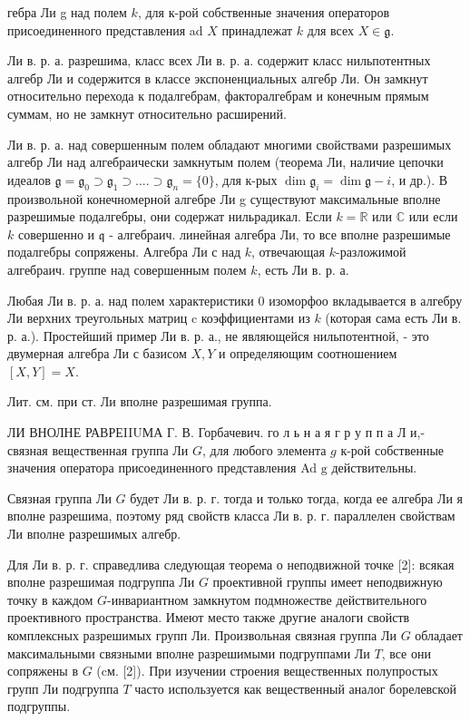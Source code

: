 \documentclass[10pt]{article}
\begin{document}
гебра Ли g над полем $k$, для к-рой собственные значения операторов присоединенного представления ad $X$ принадлежат $k$ для всех $X \in \mathfrak{g}$.



Ли в. р. а. разрешима, класс всех Ли в. р. а. содержит класс нильпотентных алгебр Ли и содержится в классе экспоненциальных алгебр Ли. Он замкнут относительно перехода к подалгебрам, факторалгебрам и конечным прямым суммам, но не замкнут относительно расширений.



Ли в. р. а. над совершенным полем обладают многими свойствами разрешимых алгебр Ли над алгебраически замкнутым полем (теорема Ли, наличие цепочки идеалов $\mathfrak{g}=\mathfrak{g}_{0} \supset \mathfrak{g}_{1} \supset \ldots . \supset \mathfrak{g}_{n}=\{0\}$, для к-рых $\operatorname{dim} \mathfrak{g}_{i}=\operatorname{dim} \mathfrak{g}-i$, и др.). В произвольной конечномерной алгебре Ли g существуют максимальные вполне разрешимые подалгебры, они содержат нильрадикал. Если $k=\mathbb{R}$ или $\mathbb{C}$ или если $k$ совершенно и $\mathfrak{q}$ - алгебраич. линейная алгебра Ли, то все вполне разрешимые подалгебры сопряжены. Алгебра Ли с над $k$, отвечающая $k$-разложимой алгебраич. группе над совершенным полем $k$, есть Ли в. р. а.



Любая Ли в. р. а. над полем характеристики 0 изоморфоо вкладывается в алгебру Ли верхних треугольных матриц $\mathrm{c}$ коэффициентами из $k$ (которая сама есть Ли в. р. а.). Простейший пример Ли в. р. а., не являющейся нильпотентной, - это двумерная алгебра Ли с базисом $X, Y$ и определяющим соотношением $[X, Y]=X$.



Лит. см. при ст. Ли вполне разрешимая группа.



ЛИ ВНОЛНЕ РАВРЕIIUМА Г. В. Горбачевич. го л ь н а я г р у п п а Л и,- связная вещественная группа Ли $G$, для любого элемента $g$ к-рой собственные значения оператора присоединенного представления Ad $\mathrm{g}$ действительны.



Связная группа Ли $G$ будет Ли в. р. г. тогда и только тогда, когда ее алгебра Ли я вполне разрешима, поэтому ряд свойств класса Ли в. р. г. параллелен свойствам Ли вполне разрешимых алгебр.



Для Ли в. р. г. справедлива следующая теорема о неподвижной точке [2]: всякая вполне разрешимая подгруппа Ли $G$ проективной группы имеет неподвижную точку в каждом $G$-инвариантном замкнутом подмножестве действительного проективного пространства. Имеют место также другие аналоги свойств комплексных разрешимых групп Ли. Произвольная связная группа Ли $G$ обладает максимальными связными вполне разрешимыми подгруппами Ли $T$, все они сопряжены в $G$ (cм. [2]). При изучении строения вещественных полупростых групп Ли подгруппа $T$ часто используется как вещественный аналог борелевской подгруппы.
\end{document}
